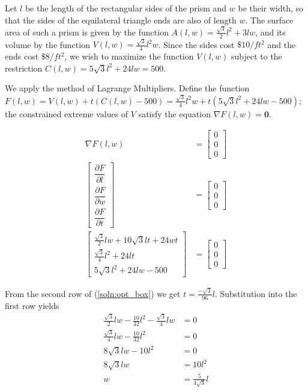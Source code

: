\item

Let $l$ be the length
of the rectangular sides of the prism and $w$ be their width, so that
the sides of the equilateral triangle ends are also of length $w$.
The surface area of such a prism is given by the function $A(l,w) =
\frac{\sqrt{3}}{2}l^2 + 3lw$, and its volume by the function $V(l,w) =
\frac{\sqrt{3}}{4}l^2w$.  Since the sides cost $\$10/ft^2$ and the ends
cost $\$8/ft^2$, we wish to maximize the function $V(l,w)$ subject to
the restriction $C(l,w) = 5\sqrt{3}l^2 + 24lw = 500$.

We apply the method of Lagrange Multipliers.  Define the function
$F(l,w) = V(l,w) + t(C(l,w) - 500) =
\frac{\sqrt{3}}{4}l^2w + t(5\sqrt{3}l^2 + 24lw - 500)$;
the constrained extreme values of $V$ satisfy the equation
$\nabla F(l,w) = \mathbf{0}$.

\begin{align}
 \nabla F(l,w) &= \begin{bmatrix} 0 \\ 0 \\ 0 \end{bmatrix} \nonumber \\
 \begin{bmatrix}
  \dfrac{\partial F}{\partial l} \\
  \dfrac{\partial F}{\partial w} \\
  \dfrac{\partial F}{\partial t}
 \end{bmatrix} &= \begin{bmatrix} 0 \\ 0 \\ 0 \end{bmatrix} \nonumber \\
 \begin{bmatrix}
  \frac{\sqrt{3}}{2}lw + 10\sqrt{3}lt + 24wt \\
  \frac{\sqrt{3}}{4}l^2 + 24lt \\
  5\sqrt{3}l^2 + 24lw - 500
 \end{bmatrix} &= \begin{bmatrix} 0 \\ 0 \\ 0 \end{bmatrix} \label{soln:opt_box}
\end{align}

From the second row of (\ref{soln:opt_box}) we get $t = \frac{-\sqrt{3}}{96}l$.
Substitution into the first row yields
\begin{align}
 \frac{\sqrt{3}}{2}lw - \frac{10}{32}l^2 - \frac{\sqrt{3}}{4}lw &= 0 \nonumber \\
 \frac{\sqrt{3}}{4}lw - \frac{10}{32}l^2 &= 0 \nonumber \\
 8\sqrt{3}lw - 10l^2 &= 0 \nonumber \\
 8\sqrt{3}lw &= 10l^2 \nonumber \\
 w &= \frac{5}{4\sqrt{3}}l \label{soln:opt_box2}
\end{align}

